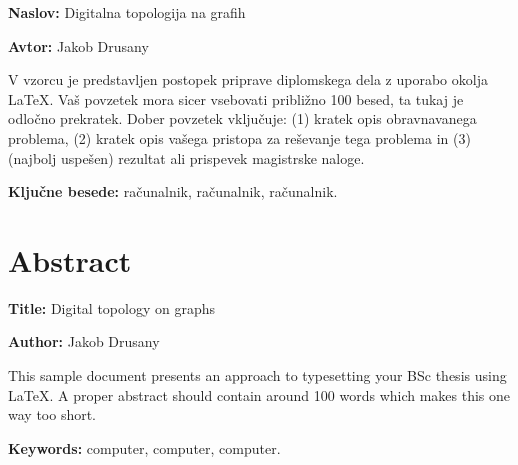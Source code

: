 \documentclass[a4paper, 12pt]{book}
\newcommand{\ttitle}{Digitalna topologija na grafih}
\newcommand{\ttitleEn}{Digital topology on graphs}
\newcommand{\tauthor}{Jakob Drusany}
\newcommand{\tkeywords}{računalnik, računalnik, računalnik}
\newcommand{\tkeywordsEn}{computer, computer, computer}
\newcommand{\clearemptydoublepage}{\newpage{\pagestyle{empty}\cleardoublepage}}
\theoremstyle{definition}
\theoremstyle{remark}
\begin{document}
\noindent\textbf{Naslov:} \ttitle
\bigskip

\noindent\textbf{Avtor:} \tauthor
\bigskip

\noindent V vzorcu je predstavljen postopek priprave diplomskega dela z uporabo okolja \LaTeX. Vaš povzetek mora sicer vsebovati približno 100 besed, ta tukaj je odločno prekratek.
Dober povzetek vključuje: (1) kratek opis obravnavanega problema, (2) kratek opis vašega pristopa za reševanje tega problema in (3) (najbolj uspešen) rezultat ali prispevek magistrske naloge.

\bigskip

\noindent\textbf{Ključne besede:} \tkeywords.
\clearemptydoublepage

\chapter*{Abstract}

\noindent\textbf{Title:} \ttitleEn
\bigskip

\noindent\textbf{Author:} \tauthor
\bigskip

\noindent This sample document presents an approach to typesetting your BSc thesis using \LaTeX. 
A proper abstract should contain around 100 words which makes this one way too short.
\bigskip

\noindent\textbf{Keywords:} \tkeywordsEn.
\clearemptydoublepage
\fi
\mainmatter
\setcounter{page}{1}
\pagestyle{fancy}
\end{document}
